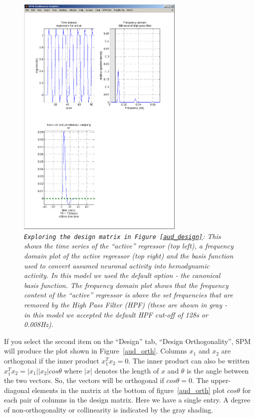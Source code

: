 \begin{figure}
\begin{center}
\includegraphics[width=80mm]{auditory/explore}
\caption{\emph{\texttt{Exploring the design matrix in Figure~\ref{aud_design}}: This shows the time series of the ``active'' regressor (top left), a frequency domain plot of the active regressor (top right) and the basis function used to convert assumed neuronal activity into hemodynamic activity. In this model we used the default option - the canonical basis function. The frequency domain plot shows that the frequency content of the ``active'' regressor is above the set frequencies that are removed by the High Pass Filter (HPF) (these are shown in gray - in this model we accepted the default HPF cut-off of 128s or 0.008Hz). \label{aud_explore}}}
\end{center}
\end{figure}

If you select the second item on the ``Design'' tab, ``Design Orthogonality'', SPM will produce the plot shown in Figure~\ref{aud_orth}. Columns $x_1$ and $x_2$ are orthogonal if the inner product $x_1^T x_2=0$. The inner product can also be written $x_1^T x_2 = |x_1||x_2| cos \theta$ where $|x|$ denotes the length of $x$ and $\theta$ is the angle between the two vectors. So, the vectors will be orthogonal if $cos \theta=0$. The upper-diagonal elements in the matrix at the bottom of figure~\ref{aud_orth} plot $cos\theta$ for each pair of columns in the design matrix. Here we have a single entry.  A degree of non-orthogonality or collinearity is indicated by the gray shading.

